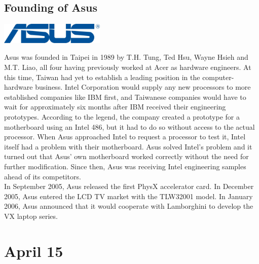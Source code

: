 \documentclass[11pt]{report}
\begin{document}
\subsection{Founding of Asus}
\vspace{2mm}\begin{center}\includegraphics[width=5cm]{./img/asusLogo.jpg}\end{center}
Asus was founded in Taipei in 1989 by T.H. Tung, Ted Hsu, Wayne Hsieh and M.T. Liao, all four having previously worked at Acer as hardware engineers. At this time, Taiwan had yet to establish a leading position in the computer-hardware business. Intel Corporation would supply any new processors to more established companies like IBM first, and Taiwanese companies would have to wait for approximately six months after IBM received their engineering prototypes. According to the legend, the company created a prototype for a motherboard using an Intel 486, but it had to do so without access to the actual processor. When Asus approached Intel to request a processor to test it, Intel itself had a problem with their motherboard. Asus solved Intel's problem and it turned out that Asus' own motherboard worked correctly without the need for further modification. Since then, Asus was receiving Intel engineering samples ahead of its competitors.\\
\indent In September 2005, Asus released the first PhysX accelerator card. In December 2005, Asus entered the LCD TV market with the TLW32001 model. In January 2006, Asus announced that it would cooperate with Lamborghini to develop the VX laptop series.
\section{April 15}
\end{document}

